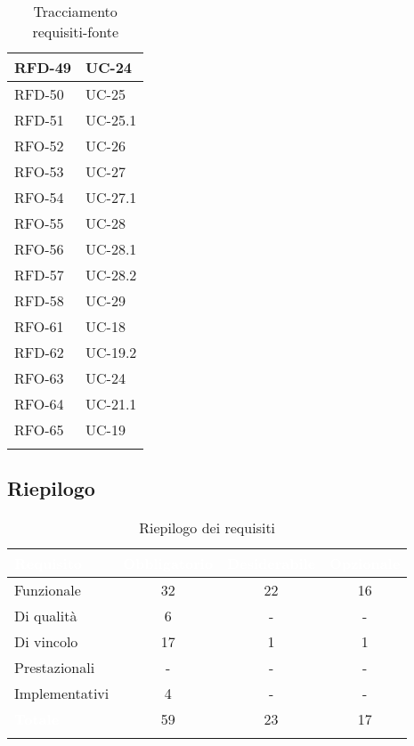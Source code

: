 \begin{xltabular}{\textwidth}{|X | X|}
    \hline
    RFD-49 & UC-24 \\
    \hline
    RFD-50 & UC-25 \\
    \hline
    RFD-51 & UC-25.1 \\
    \hline
    RFO-52 & UC-26 \\
    \hline
    RFO-53 & UC-27 \\
    \hline
    RFO-54 & UC-27.1 \\
    \hline
    RFO-55 & UC-28 \\
    \hline
    RFO-56 & UC-28.1 \\
    \hline
    RFD-57 & UC-28.2 \\
    \hline
    RFD-58 & UC-29 \\
    \hline
    RFO-61 & UC-18 \\
    \hline
    RFD-62 & UC-19.2 \\
    \hline
    RFO-63 & UC-24 \\
    \hline
    RFO-64 & UC-21.1 \\
    \hline
    RFO-65 & UC-19\\
\hline
     \caption{Tracciamento requisiti-fonte}
    \label{tab:riepilogo}
\end{xltabular}

\subsection{Riepilogo}
\begingroup
\setlength{\tabcolsep}{10pt}
\renewcommand{\arraystretch}{1.5}
\begin{xltabular}{\textwidth}{| X | c | c | c |}
    \hline
     \textbf{\textcolor{white}{Requisito}} & \textbf{\textcolor{white}{Obbligatorio}} & \textbf{\textcolor{white}{Desiderabile}} & \textbf{\textcolor{white}{Opzionale}}\\
    \hline
    \endhead
    Funzionale & 32 & 22 & 16 \\
    \hline
    Di qualità & 6 & - & - \\
    \hline
    Di vincolo & 17 & 1 & 1 \\
    \hline
    Prestazionali & - & - & - \\
    \hline
    Implementativi & 4 & - & - \\
    \hline
     \textbf{\textcolor{white}{Totale}} & 59 & 23 & 17 \\
    \hline
     \caption{Riepilogo dei requisiti}
    \label{tab:riepilogo}
\end{xltabular}
\endgroup



